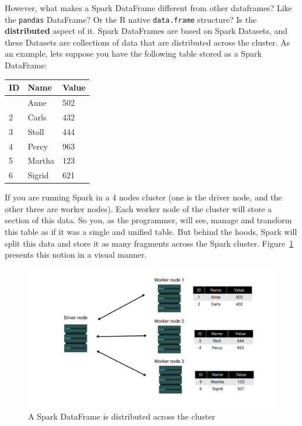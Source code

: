 \documentclass[
  11pt,
  letterpaper,
  DIV=11,
  numbers=noendperiod]{scrreprt}
\begin{document}
However, what makes a Spark DataFrame different from other dataframes?
Like the \texttt{pandas} DataFrame? Or the R native \texttt{data.frame}
structure? Is the \textbf{distributed} aspect of it. Spark DataFrames
are based on Spark Datasets, and these Datasets are collections of data
that are distributed across the cluster. As an example, lets suppose you
have the following table stored as a Spark DataFrame:

\begin{longtable}[]{@{}lll@{}}
\toprule\noalign{}
ID & Name & Value \\
\midrule\noalign{}
\endhead
\bottomrule\noalign{}
\endlastfoot
1 & Anne & 502 \\
2 & Carls & 432 \\
3 & Stoll & 444 \\
4 & Percy & 963 \\
5 & Martha & 123 \\
6 & Sigrid & 621 \\
\end{longtable}

If you are running Spark in a 4 nodes cluster (one is the driver node,
and the other three are worker nodes). Each worker node of the cluster
will store a section of this data. So you, as the programmer, will see,
manage and transform this table as if it was a single and unified table.
But behind the hoods, Spark will split this data and store it as many
fragments across the Spark cluster. Figure~\ref{fig-distributed-df}
presents this notion in a visual manner.

\begin{figure}

{\centering \includegraphics{Chapters/../Figures/distributed-df.png}

}

\caption{\label{fig-distributed-df}A Spark DataFrame is distributed
across the cluster}

\end{figure}
\end{document}

